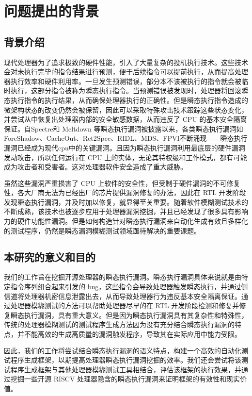 \section{问题提出的背景}

\subsection{背景介绍}

现代处理器为了追求极致的硬件性能，引入了大量复杂的投机执行技术\cite{gonzalez2010processor}。这些技术会对未执行完毕的指令结果进行预测，便于后续指令可以提前执行，从而提高处理器执行效率和硬件利用率。一旦发生预测错误，部分本不该被执行的指令就会被临时执行，这部分指令被称为瞬态执行指令。当预测错误被发现时，处理器将回滚瞬态执行指令的执行结果，从而确保处理器执行的正确性。但是瞬态执行指令造成的微架构状态的改变仍然会被保留，因此可以采取特殊攻击技术跟踪这些状态变化，并尝试从中恢复出处理器内部的安全敏感数据，从而违反了 CPU 的基本安全隔离保证。自Spectre\cite{kocher2020spectre}和 Meltdown\cite{horn2018meltdown} 等瞬态执行漏洞被披露以来，各类瞬态执行漏洞如 ForeShadow\cite{van2018foreshadow}、CacheOut\cite{van2021cacheout}、Ret2Spec\cite{maisuradze2018ret2spec}、RIDL\cite{mathure2023hardware}、MDS\cite{minkin2019fallout}、FPVI\cite{ragab2021rage}不断涌现——瞬态执行漏洞已经成为现代cpu中的关键漏洞。且因为瞬态执行漏洞利用最底层的硬件漏洞发动攻击，所以任何运行在 CPU 上的实体，无论其特权级和工作模式，都有可能成为攻击者和受害者。这对处理器软件安全造成了重大威胁。\par

虽然这些漏洞严重损害了 CPU 上软件的安全性，但受制于硬件漏洞的不可修复性，各大厂商无法为已经出厂的芯片提供漏洞修复的办法，因此在 RTL 开发阶段发现瞬态执行漏洞，并及时加以修复，就显得至关重要。随着软件模糊测试技术的不断成熟，该技术也被逐步应用于处理器漏洞挖掘，并且已经发现了很多具有影响力的硬件功能性漏洞。但是如何构造针对瞬态执行漏洞来自动化生成有效且多样化的测试程序，仍然是瞬态漏洞模糊测试领域亟待解决的重要课题。\par

\subsection{本研究的意义和目的}

我们的工作旨在挖掘开源处理器的瞬态执行漏洞。瞬态执行漏洞具体来说就是由特定指令序列组合起来引发的 bug，这些指令会导致处理器触发瞬态执行，并通过侧信道将处理器机密信息泄露出去，从而导致处理器行为违反基本安全隔离保证。通过处理器模糊测试的方法可以帮助处理器尽早的在 RTL 开发阶段检测和修复并修复瞬态执行漏洞，具有重大意义。但是因为瞬态执行漏洞具有其复杂性和特殊性，传统的处理器模糊测试的测试程序生成方法因为没有充分结合瞬态执行漏洞的特点，并不能高效的生成高质量的漏洞触发程序，导致其在实际应用中能力受限。\par

因此，我们的工作将尝试结合瞬态执行漏洞的语义特点，构建一个高效的自动化测试程序生成框架，以期提高处理器瞬态执行漏洞挖掘的效率。我们还会尝试将该测试程序生成框架与其他处理器模糊测试工具相结合，评估该框架的执行效果，并通过挖掘一些开源 RISCV 处理器隐含的瞬态执行漏洞来证明框架的有效性和现实价值。\par





